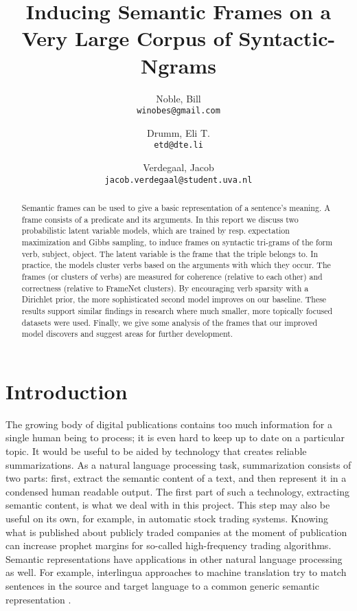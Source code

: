 \documentclass{article} %
\title{Inducing Semantic Frames on a Very Large Corpus of Syntactic-Ngrams}
\author{
    Noble, Bill\\
    \texttt{winobes@gmail.com}
    \and
    Drumm, Eli T.\\
    \texttt{etd@dte.li}
    \and
    Verdegaal, Jacob\\
    \texttt{jacob.verdegaal@student.uva.nl}
}
\begin{document}
\maketitle


\begin{abstract}
  Semantic frames can be used to give a basic representation of a sentence's meaning. A frame consists of a predicate and its arguments. In this report we discuss two probabilistic latent variable models, which are trained by resp. expectation maximization and Gibbs sampling, to induce frames on syntactic tri-grams of the form verb, subject, object. The latent variable is the frame that the triple belongs to. In practice, the models cluster verbs based on the arguments with which they occur. The frames (or clusters of verbs) are measured for coherence (relative to each other) and correctness (relative to FrameNet clusters). By encouraging verb sparsity with a Dirichlet prior, the more sophisticated second model improves on our baseline. These results support similar findings in research where much smaller, more topically focused datasets were used. Finally, we give some analysis of the frames that our improved model discovers and suggest areas for further development.
\end{abstract}

\section{Introduction}
The growing body of digital publications contains too much information for a single human being to process; it is even hard to keep up to date on a particular topic. It would be useful to be aided by technology that creates reliable summarizations. As a natural language processing task, summarization consists of two parts: first, extract the semantic content of a text, and then represent it in a condensed human readable output. The first part of such a technology, extracting semantic content, is what we deal with in this project. This step may also be useful on its own, for example, in automatic stock trading systems. Knowing what is published about publicly traded companies at the moment of publication can increase prophet margins for so-called high-frequency trading algorithms. Semantic representations have applications in other natural language processing as well. For example, interlingua approaches to machine translation try to match sentences in the source and target language to a common generic semantic representation \cite{boas2005}.
\end{document}
